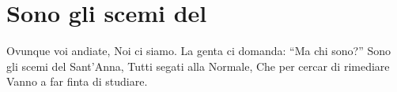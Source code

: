 \section{Sono gli scemi del \santanna}
\subtitle{Ogni verso si canta due volte}
\begin{canzone}
Ovunque voi andiate,
Noi ci siamo.
La genta ci domanda:
“Ma chi sono?”
Sono gli scemi del Sant’Anna,
Tutti segati alla Normale,
Che per cercar di rimediare
Vanno a far finta di studiare. 
\end{canzone}
